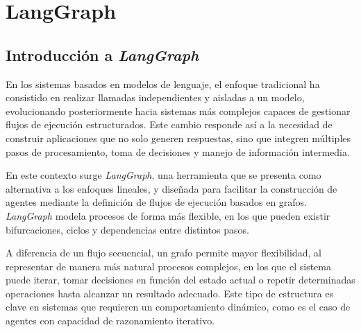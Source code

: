 \documentclass[12pt,a4paper,twoside,openright]{book}
\begin{document}

\chapter{LangGraph}

\section{Introducción a \emph{LangGraph}}

En los sistemas basados en modelos de lenguaje, el enfoque tradicional ha consistido en realizar llamadas independientes y aisladas a un modelo, evolucionando posteriormente
hacia sistemas más complejos capaces de gestionar flujos de ejecución estructurados. Este cambio responde así a la necesidad de construir aplicaciones que no solo generen
respuestas, sino que integren múltiples pasos de procesamiento, toma de decisiones y manejo de información intermedia.

En este contexto surge \emph{LangGraph}, una herramienta que se presenta como alternativa a los enfoques lineales, y diseñada para facilitar la construcción de agentes
mediante la definición de flujos de ejecución basados en grafos. \emph{LangGraph} modela procesos de forma más flexible, en los que pueden existir bifurcaciones, ciclos y
dependencias entre distintos pasos. \cite{langgraph2024}

A diferencia de un flujo secuencial, un grafo permite mayor flexibilidad, al representar de manera más natural procesos complejos, en los que el sistema puede iterar,
tomar decisiones en función del estado actual o repetir determinadas operaciones hasta alcanzar un resultado adecuado. Este tipo de estructura es clave en sistemas que requieren
un comportamiento dinámico, como es el caso de agentes con capacidad de razonamiento iterativo.
\end{document}
